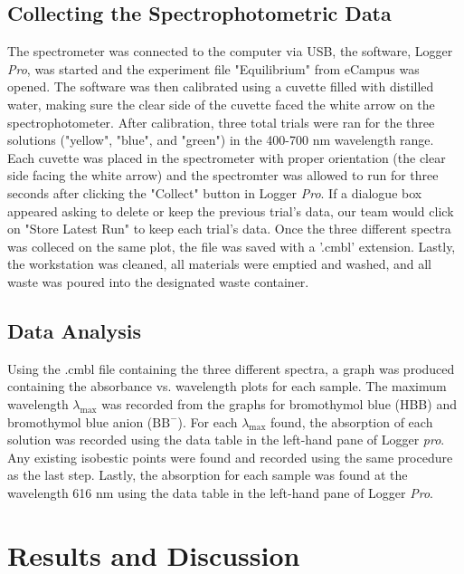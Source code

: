 \documentclass[10pt]{article} %
\begin{document}
\subsection{Collecting the Spectrophotometric Data}
The spectrometer was connected to the computer via USB, the software, Logger \textit{Pro}, was started and the experiment file "Equilibrium" from eCampus was opened. The software was then calibrated using a cuvette filled with distilled water, making sure the clear side of the cuvette faced the white arrow on the spectrophotometer. After calibration, three total trials were ran for the three solutions ("yellow", "blue", and "green") in the 400-700 nm wavelength range. Each cuvette was placed in the spectrometer with proper orientation (the clear side facing the white arrow) and the spectromter was allowed to run for three seconds after clicking the "Collect" button in Logger \textit{Pro}. If a dialogue box appeared asking to delete or keep the previous trial's data, our team would click on "Store Latest Run" to keep each trial's data. Once the three different spectra was colleced on the same plot, the file was saved with a '.cmbl' extension. Lastly, the workstation was cleaned, all materials were emptied and washed, and all waste was poured into the designated waste container. 

\subsection{Data Analysis}
Using the .cmbl file containing the three different spectra, a graph was produced containing the absorbance vs. wavelength plots for each sample. The maximum wavelength $\lambda_{\text{max}}$ was recorded from the graphs for bromothymol blue (HBB) and bromothymol blue anion ($\text{BB}^-$). For each $\lambda_{\text{max}}$ found, the absorption of each solution was recorded using the data table in the left-hand pane of Logger \textit{pro}. Any existing isobestic points were found and recorded using the same procedure as the last step. Lastly, the absorption for each sample was found at the wavelength 616 nm using the data table in the left-hand pane of Logger \textit{Pro}. 

\section{Results and Discussion}
\end{document}
